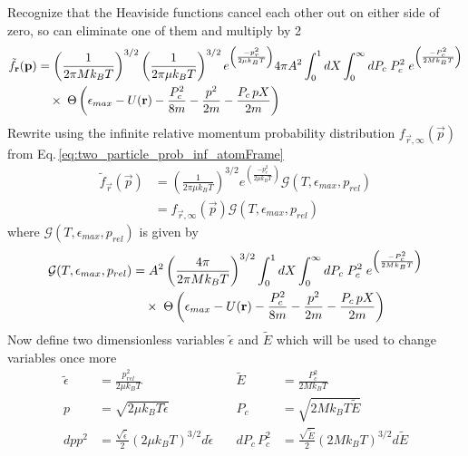Recognize that the Heaviside functions cancel each other out on either side of zero, so can eliminate one of them and multiply by 2
\begin{equation}
\begin{split}
	 \tilde{f}_{\mathbf{r}}(\mathbf{p}) &= \left(\frac{1}{2 \pi M k_B T}\right)^{3/2} \left(\frac{1}{2 \pi \mu k_B T}\right)^{3/2} e^{\left(\frac{-p_r^2}{2 \mu k_B T}\right)} 4 \pi A^2 \int_0^1 dX \int_0^{\infty} dP_c \; P_c^2 \; e^{\left(\frac{-P_c^2}{2 M k_B T}\right)} \\ 
	 &\quad \times \; \Theta \left( {\epsilon_{max} - U(\mathbf{r}) - \frac{P_c^2}{8m} - \frac{p^2}{2m} - \frac{P_c \, p X}{2m}} \right) 
\end{split}
\end{equation}
Rewrite using the infinite relative momentum probability distribution $f_{\vec{r}, \infty} (\vec{p})$ from Eq.\,\ref{eq:two_particle_prob_inf_atomFrame}
\begin{equation}
\begin{split}
	 \tilde{f}_{\vec{r}}(\vec{p}) &= \left(\frac{1}{2 \pi \mu k_B T}\right)^{3/2} e^{\left(\frac{-p_r^2}{2 \mu k_B T}\right)} \mathcal{G}(T, \epsilon_{max}, p_{rel}) \\
	 &= f_{\vec{r}, \infty} (\vec{p}) \mathcal{G}(T, \epsilon_{max}, p_{rel})
\end{split}
\end{equation}
where $\mathcal{G}(T, \epsilon_{max}, p_{rel})$ is given by
\begin{equation} \label{eq:mom_dist_st_3}
\begin{split}
	\mathcal{G}(T, \epsilon_{max}, p_{rel}) &= A^2 \left(\frac{4 \pi}{2 \pi M k_B T}\right)^{3/2} \int_0^1 dX \int_0^{\infty} dP_c \; P_c^2 \; e^{\left(\frac{-P_c^2}{2 M k_B T}\right)} \\ 
	 &\quad \times \; \Theta \left( {\epsilon_{max} - U(\mathbf{r}) - \frac{P_c^2}{8m} - \frac{p^2}{2m} - \frac{P_c \, p X}{2m}} \right) 
\end{split}
\end{equation}
Now define two dimensionless variables $\tilde{\epsilon}$ and $\tilde{E}$ which will be used to change variables once more
\begin{align*}
	\tilde{\epsilon} &= \frac{p_{rel}^2}{2 \mu k_B T} 												&\quad 		\tilde{E}  &= \frac{P_c^2}{2 M k_B T} \\
	p 				 &= \sqrt{2 \mu k_B T \tilde{\epsilon}}    										&\quad  	P_c 	   &= \sqrt{2 M k_B T \tilde{E}} \\
	dp p^2 			 &= \frac{\sqrt{\tilde{\epsilon}}}{2}(2 \mu k_B T)^{3/2} d \tilde{\epsilon} 	&\quad		dP_c \, P_c^2 &= \frac{\sqrt{\tilde{E}}}{2}(2 M k_B T)^{3/2} d \tilde{E}
\end{align*}
